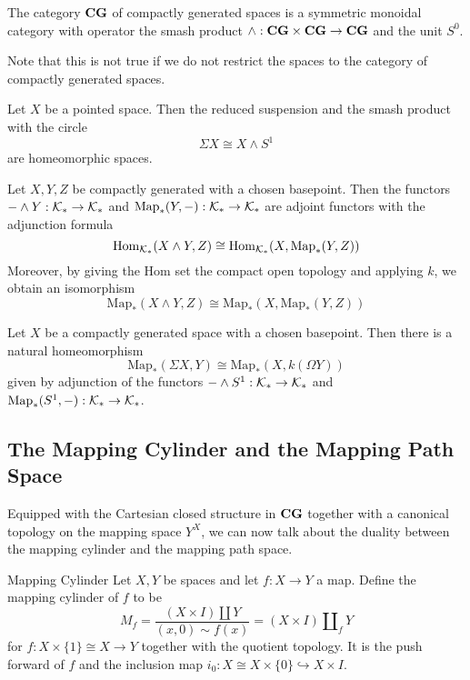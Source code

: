 \documentclass[a4paper]{article}
\begin{document}
\begin{thm}{}{} The category $\bold{CG}$ of compactly generated spaces is a symmetric monoidal category with operator the smash product $\wedge:\bold{CG}\times\bold{CG}\to\bold{CG}$ and the unit $S^0$. 
\end{thm}

Note that this is not true if we do not restrict the spaces to the category of compactly generated spaces. 

\begin{lmm}{}{} Let $X$ be a pointed space. Then the reduced suspension and the smash product with the circle $$\Sigma X\cong X\wedge S^1$$ are homeomorphic spaces. 
\end{lmm}

\begin{thm}{}{} Let $X,Y,Z$ be compactly generated with a chosen basepoint. Then the functors $-\wedge Y:\mathcal{K}_\ast\to\mathcal{K}_\ast$ and $\text{Map}_\ast(Y,-):\mathcal{K}_\ast\to\mathcal{K}_\ast$ are adjoint functors with the adjunction formula $$\operatorname{Hom}_{\mathcal{K}_\ast}(X\wedge Y,Z)\cong\operatorname{Hom}_{\mathcal{K}_\ast}(X,\text{Map}_\ast(Y,Z))$$ Moreover, by giving the Hom set the compact open topology and applying $k$, we obtain an isomorphism $$\text{Map}_\ast(X\wedge Y,Z)\cong\text{Map}_\ast(X,\text{Map}_\ast(Y,Z))$$
\end{thm}

\begin{crl}{}{} Let $X$ be a compactly generated space with a chosen basepoint. Then there is a natural homeomorphism $$\text{Map}_\ast(\Sigma X,Y)\cong\text{Map}_\ast(X,k(\Omega Y))$$ given by adjunction of the functors $-\wedge S^1:\mathcal{K}_\ast\to\mathcal{K}_\ast$ and $\text{Map}_\ast(S^1,-):\mathcal{K}_\ast\to\mathcal{K}_\ast$. 
\end{crl}

\subsection{The Mapping Cylinder and the Mapping Path Space}
Equipped with the Cartesian closed structure in $\bold{CG}$ together with a canonical topology on the mapping space $Y^X$, we can now talk about the duality between the mapping cylinder and the mapping path space. 

\begin{defn}{Mapping Cylinder}{} Let $X,Y$ be spaces and let $f:X\to Y$ a map. Define the mapping cylinder of $f$ to be $$M_f=\frac{(X\times I)\amalg Y}{(x,0)\sim f(x)}=(X\times I)\amalg_fY$$ for $f:X\times\{1\}\cong X\to Y$ together with the quotient topology. It is the push forward of $f$ and the inclusion map $i_0:X\cong X\times\{0\}\hookrightarrow X\times I$. 
\end{defn}
\end{document}

